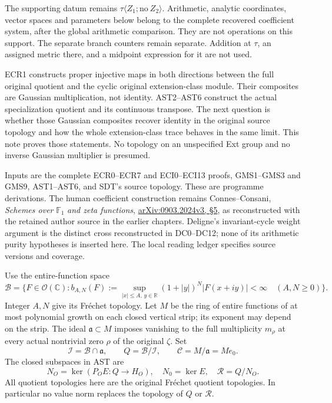 The supporting datum remains
\(\tau\langle Z_1;\mathrm{no}\ Z_2\rangle\). Arithmetic, analytic
coordinates, vector spaces and parameters below belong to the complete
recovered coefficient system, after the global arithmetic comparison.
They are not operations on this support. The separate branch counters
remain separate. Addition at \(\tau\), an assigned metric there, and a
midpoint expression for it are not used.

ECR1 constructs proper injective maps in both directions between the
full original quotient and the cyclic original extension-class module.
Their composites are Gaussian multiplication, not identity. AST2--AST6
construct the actual specialization quotient and its continuous
transpose. The next question is whether those Gaussian composites
recover identity in the original source topology and how the whole
extension-class trace behaves in the same limit. This note proves those
statements. No topology on an unspecified Ext group and no inverse
Gaussian multiplier is presumed.

Inputs are the complete ECR0--ECR7 and ECI0--ECI13 proofs, GMS1--GMS3
and GMS9, AST1--AST6, and SDT's source topology. These are programme
derivations. The human coefficient construction remains Connes--Consani,
\emph{Schemes over} \(\mathbb F_1\) \emph{and zeta functions},
\href{https://arxiv.org/abs/0903.2024v3}{arXiv:0903.2024v3, §5}, as
reconstructed with the retained author source in the earlier chapters.
Deligne's invariant-cycle weight argument is the distinct cross
reconstructed in DC0--DC12; none of its arithmetic purity hypotheses is
inserted here. The local reading ledger specifies source versions and
coverage.

Use the entire-function space \[
\mathcal B=\{F\in\mathcal O(\mathbb C):
b_{A,N}(F):=\sup_{|x|\le A,\,y\in\mathbb R}
(1+|y|)^N|F(x+iy)|<\infty\quad(A,N\ge0)\}.
\tag{GAP0.1}
\] Integer \(A,N\) give its Fréchet topology. Let \(M\) be the ring of
entire functions of at most polynomial growth on each closed vertical
strip; its exponent may depend on the strip. The ideal
\(\mathfrak a\subset M\) imposes vanishing to the full multiplicity
\(m_\rho\) at every actual nontrivial zero \(\rho\) of the original
\(\zeta\). Set \[
\mathcal I=\mathcal B\cap\mathfrak a,\qquad
Q=\mathcal B/\mathcal I,\qquad
\mathscr C=M/\mathfrak a=M e_0.
\tag{GAP0.2}
\] The closed subspaces in AST are \[
N_O=\ker(P_OE:Q\to H_O),\quad N_0=\ker E,
\quad\mathcal R=Q/N_O.
\tag{GAP0.3}
\] All quotient topologies here are the original Fréchet quotient
topologies. In particular no value norm replaces the topology of \(Q\)
or \(\mathcal R\).

